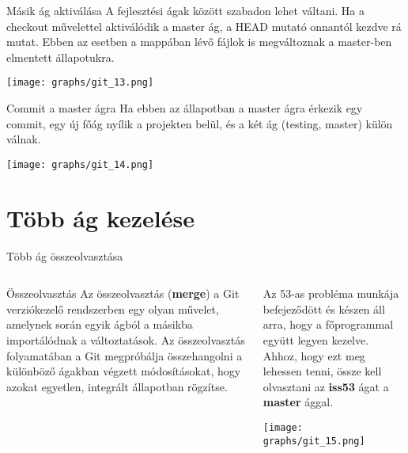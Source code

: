 \documentclass[english, aspectratio=169]{beamer}
\makeatletter
\let\origtableofcontents=\tableofcontents
\def\tableofcontents{\@ifnextchar[{\origtableofcontents}{\gobbletableofcontents}}
\def\gobbletableofcontents#1{\origtableofcontents}
\makeatother
\begin{document}
\begin{frame}{Másik ág aktiválása}
A fejlesztési ágak között szabadon lehet váltani. Ha a checkout művelettel aktiválódik a master ág, a HEAD mutató onnantól kezdve rá mutat. Ebben az esetben a mappában lévő fájlok is megváltoznak a master-ben elmentett állapotukra.
\begin{center}
\texttt{[image: graphs/git\_13.png]}
\end{center}
\end{frame}

\begin{frame}{Commit a master ágra}
Ha ebben az állapotban a master ágra érkezik egy commit, egy új főág nyílik a projekten belül, és a két ág (testing, master) külön válnak.
\begin{center}
\texttt{[image: graphs/git\_14.png]}
\end{center}
\end{frame}

\section{Több ág kezelése}

\begin{frame}
	\tableofcontents[currentsection]
\end{frame}

\begin{frame}{Több ág összeolvasztása}
\begin{columns}
\begin{column}{0.4\textwidth}
\begin{center}
\begin{block}{Összeolvasztás}
Az összeolvasztás (\textbf{merge}) a Git verziókezelő rendszerben egy olyan művelet, amelynek során egyik ágból a másikba importálódnak a változtatások. Az összeolvasztás folyamatában a Git megpróbálja összehangolni a különböző ágakban végzett módosításokat, hogy azokat egyetlen, integrált állapotban rögzítse.
\end{block}
\end{center}
\end{column}
\begin{column}{0.6\textwidth}
Az 53-as probléma munkája befejeződött és készen áll arra, hogy a főprogrammal együtt legyen kezelve. Ahhoz, hogy ezt meg lehessen tenni, össze kell olvasztani az \textbf{iss53} ágat a \textbf{master} ággal.
\begin{center}
\texttt{[image: graphs/git\_15.png]}
\end{center}
\end{column}
\end{columns}
\end{frame}
\end{document}
